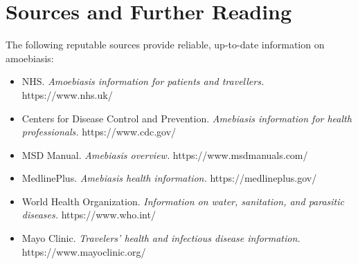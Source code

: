 \section*{Sources and Further Reading}
The following reputable sources provide reliable, up-to-date information on amoebiasis:

\begin{itemize}
    \item NHS. \textit{Amoebiasis information for patients and travellers.} https://www.nhs.uk/
    \item Centers for Disease Control and Prevention. \textit{Amebiasis information for health professionals.} https://www.cdc.gov/
    \item MSD Manual. \textit{Amebiasis overview.} https://www.msdmanuals.com/
    \item MedlinePlus. \textit{Amebiasis health information.} https://medlineplus.gov/
    \item World Health Organization. \textit{Information on water, sanitation, and parasitic diseases.} https://www.who.int/
    \item Mayo Clinic. \textit{Travelers' health and infectious disease information.} https://www.mayoclinic.org/
\end{itemize}
